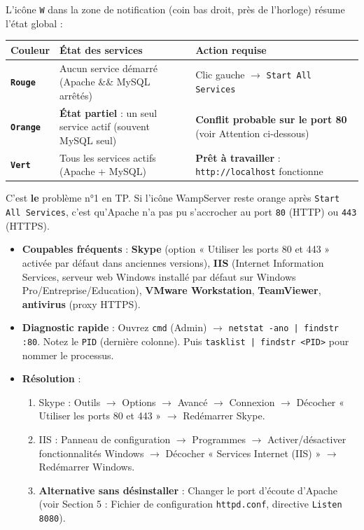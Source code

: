 \documentclass[11pt]{article}
\begin{document}
\begin{propriete}
L'icône \texttt{W} dans la zone de notification (coin bas droit, près de l'horloge) résume l'état global :
\begin{center}
\begin{tabularx}{\linewidth}{|l|X|X|}
\hline
\rowcolor{popblueL}
\textbf{Couleur} & \textbf{État des services} & \textbf{Action requise} \\
\hline
\textcolor{poppink}{\textbf{\texttt{Rouge}}} & Aucun service démarré (Apache \&\& MySQL arrêtés) & Clic gauche $\to$ \texttt{Start All Services} \\
\hline
\textcolor{poporange}{\textbf{\texttt{Orange}}} & \textbf{État partiel} : un seul service actif (souvent MySQL seul) & \textbf{Conflit probable sur le port 80} (voir Attention ci-dessous) \\
\hline
\textcolor{popgreen}{\textbf{\texttt{Vert}}} & Tous les services actifs (Apache + MySQL) & \textbf{Prêt à travailler} : \texttt{http://localhost} fonctionne \\
\hline
\end{tabularx}
\end{center}
\end{propriete}

\begin{attention}
C'est \textbf{le} problème n°1 en TP. Si l'icône WampServer reste orange après \texttt{Start All Services}, c'est qu'Apache n'a pas pu s'accrocher au port \texttt{80} (HTTP) ou \texttt{443} (HTTPS).
\begin{itemize}
    \item \textbf{Coupables fréquents} : \textbf{Skype} (option « Utiliser les ports 80 et 443 » activée par défaut dans anciennes versions), \textbf{IIS} (Internet Information Services, serveur web Windows installé par défaut sur Windows Pro/Entreprise/Education), \textbf{VMware Workstation}, \textbf{TeamViewer}, \textbf{antivirus} (proxy HTTPS).
    \item \textbf{Diagnostic rapide} : Ouvrez \texttt{cmd} (Admin) $\to$ \texttt{netstat -ano | findstr :80}. Notez le \texttt{PID} (dernière colonne). Puis \texttt{tasklist | findstr <PID>} pour nommer le processus.
    \item \textbf{Résolution} :
    \begin{enumerate}
        \item Skype : Outils $\to$ Options $\to$ Avancé $\to$ Connexion $\to$ Décocher « Utiliser les ports 80 et 443 » $\to$ Redémarrer Skype.
        \item IIS : Panneau de configuration $\to$ Programmes $\to$ Activer/désactiver fonctionnalités Windows $\to$ Décocher « Services Internet (IIS) » $\to$ Redémarrer Windows.
        \item \textbf{Alternative sans désinstaller} : Changer le port d'écoute d'Apache (voir Section 5 : Fichier de configuration \texttt{httpd.conf}, directive \texttt{Listen 8080}).
    \end{enumerate}
\end{itemize}
\end{attention}
\end{document}
